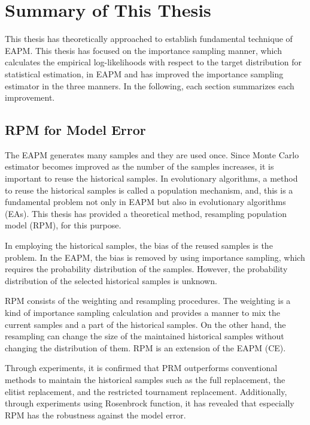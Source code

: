 \section{Summary of This Thesis}
This thesis has theoretically approached
to establish fundamental technique of EAPM.
This thesis has focused on the importance sampling manner, 
which calculates the empirical log-likelihoods
with respect to the target distribution for statistical estimation,
in EAPM and
has improved the importance sampling estimator
in the three manners. 
In the following, 
each section summarizes each improvement.


\subsection{RPM for Model Error} 
The EAPM generates many samples and 
they are used once.
Since Monte Carlo estimator becomes improved  
as the number of the samples increases,
it is important to reuse the historical samples.
In evolutionary algorithms, 
a method to reuse the historical samples is 
called a population mechanism, 
and, 
this is a fundamental problem not only in EAPM 
but also in evolutionary algorithms (EAs).
This thesis has provided a theoretical method,
resampling population model (RPM), for
this purpose.

In employing the historical samples,
the bias of the reused samples is the problem.
In the EAPM, the bias is removed by using importance sampling,
which requires the probability distribution of the samples. 
However, 
the probability distribution of the selected historical samples
is unknown.

RPM 
consists of the weighting and resampling procedures.
The weighting is a kind of importance sampling calculation 
and provides a manner to mix the current samples and
a part of the historical samples.
On the other hand,
the resampling can change the size of 
the maintained historical samples 
without changing the distribution of them.
RPM is an extension of the EAPM (CE).

Through experiments,
it is confirmed that 
PRM outperforms conventional methods 
to maintain the historical samples such as 
the full replacement, the elitist replacement, and the restricted
tournament replacement.
Additionally, through experiments using Rosenbrock function,
it has revealed that 
especially RPM has the robustness against the model error.


